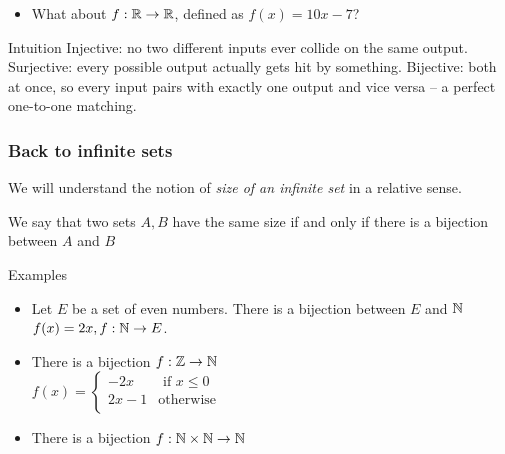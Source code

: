 \begin{frame}[fragile]
\begin{itemize}
\begin{itemize}
\item What about $f: {{\mathbb{R}}} \rightarrow {{\mathbb{R}}}$, defined as $f(x) = 10x - 7$?

\end{itemize}

\end{itemize}

\begin{block}{Intuition}
Injective: no two different inputs ever collide on the same output. Surjective: every possible output actually gets hit by something. Bijective: both at once, so every input pairs with exactly one output and vice versa -- a perfect one-to-one matching.
\end{block}
\end{frame}

 \begin{frame}[fragile]
\frametitle{Back to infinite sets}
We will understand the notion of {\it size of an infinite set} in a relative sense.

\begin{definition}
We say that two sets $A,B$ have the same size if and only if there is a bijection between $A$ and $B$
\end{definition}


Examples

\begin{itemize}
\item Let $E$ be a set of even numbers. There is a bijection between $E$ and ${{\mathbb{N}}}$\\


$f(x) = 2x, f: {{\mathbb{N}}} \rightarrow E$.


\item There is a bijection $f: {{\mathbb{Z}}} \rightarrow {{\mathbb{N}}}$\\


$f(x) = \left\{\begin{array}{cc}
				-2x & \mbox{ if } x \leq 0\\
				2x-1 & \mbox{otherwise}\\
			\end{array}	
				\right.$


\item There is a bijection $f: {{\mathbb{N}}} \times {{\mathbb{N}}} \rightarrow {{\mathbb{N}}}$\\

%
%
%
%
\end{itemize}
\end{frame}

